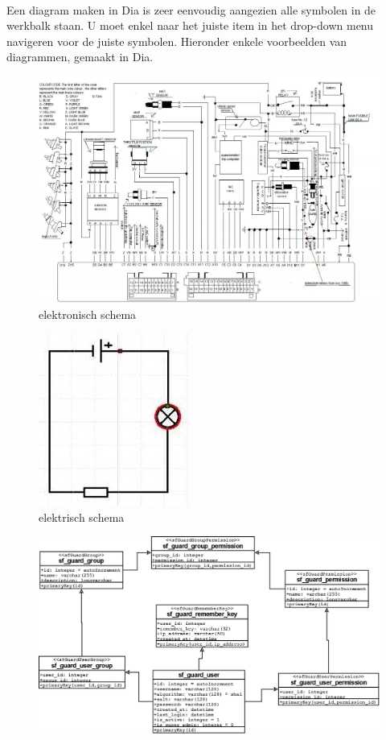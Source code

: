 \documentclass[12pt,a4paper]{report}
\begin{document}
\begin{flushleft}
\paragraph*{}
Een diagram maken in Dia is zeer eenvoudig aangezien alle symbolen in de werkbalk staan. U moet enkel naar het juiste item in het drop-down menu navigeren voor de juiste symbolen. Hieronder enkele voorbeelden van diagrammen, gemaakt in Dia.
\begin{figure}[H]
\includegraphics[scale=0.5]{images/voorbeeldschema_elektronisch.png}
\centering 
\vspace{-10pt}
\caption{elektronisch schema}
\end{figure}
\begin{figure}[H]
\includegraphics[scale=1]{images/voorbeeldschema_elektrisch.png}
\centering 
\vspace{-10pt}
\caption{elektrisch schema}
\end{figure}
\begin{figure}[H]
\includegraphics[scale=0.25]{images/voorbeeldschema_ERD.png}

\end{figure}
\end{flushleft}
\end{document}
